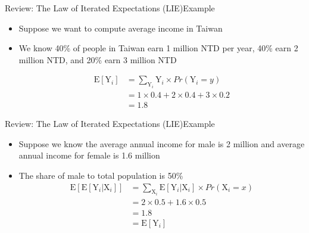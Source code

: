 \documentclass[hyperref={pdfpagelabels=false}]{beamer}
\begin{document}
\begin{frame}{Review: The Law of Iterated Expectations (LIE)}{Example}
	
	
	\begin{itemize}
		
		\item Suppose we want to compute average income in Taiwan
		\vspace{0.2cm}
		\item[1] We know 40\% of people in Taiwan earn 1 million NTD per year, 40\% earn 2 million NTD, and 20\% earn 3 million NTD  
		\vspace{0.2cm}
		
		\begin{equation*}
		\begin{aligned}
		\mathrm{E}[\mathrm{Y}_{i}] &= \sum_{\mathrm{Y}^{}_{i}} \mathrm{Y}_{i} \times Pr(\mathrm{Y}_{i}=y) \\
		&= 1 \times 0.4 + 2 \times 0.4 + 3 \times 0.2 \\ 
		&= 1.8
		\end{aligned}
		\end{equation*}	
		
		
	\end{itemize}
\end{frame}



\begin{frame}{Review: The Law of Iterated Expectations (LIE)}{Example}
	
	
	\begin{itemize}
		
		\item[2] Suppose we know the average annual income for male is 2 million and average annual income for female is 1.6 million
		\vspace{0.2cm}
		\item The share of male to total population is 50\%
		\vspace{0.2cm}
		\begin{equation*}
		\begin{aligned}
		\mathrm{E}[\mathrm{E}[\mathrm{Y}_{i} | \mathrm{X}_{i}]] &= \sum_{\mathrm{X}^{}_{i}} \mathrm{E}[\mathrm{Y}_{i} | \mathrm{X}_{i}] \times Pr(\mathrm{X}_{i}=x) \\
		&= 2 \times 0.5 + 1.6 \times 0.5  \\
		&= 1.8  \\
		&= \mathrm{E}[\mathrm{Y}_{i}] 
		\end{aligned}
		\end{equation*}	
		
	\end{itemize}
\end{frame}
\end{document}
